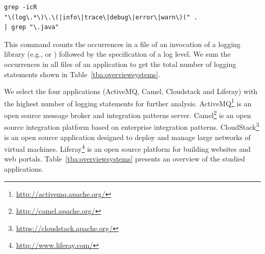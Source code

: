 \vspace{-5mm}
\begin{Code}
\begin{lstlisting}[caption={Counting logging statements}, label={lst:grep}]
grep -icR 
"\(log\.*\)\.\(|info\|trace\|debug\|error\|warn\)(" . 
| grep "\.java"
\end{lstlisting}
\end{Code}
\vspace{-5mm}

This command counts the occurrences in a file of an invocation of a logging library (e.g.,  or ) followed by the specification of a log level. We sum the occurrences in all files of an application to get the total number of logging statements shown in Table~\ref{tba:overviewsystems}.
 
We select the four applications (ActiveMQ, Camel, Cloudstack and Liferay) with the highest number of logging statements for further analysis. ActiveMQ\footnote{\url{http://activemq.apache.org/}} is an open source message broker and integration patterns server. Camel\footnote{\url{http://camel.apache.org/}} is an open source integration platform based on enterprise integration patterns. CloudStack\footnote{\url{https://cloudstack.apache.org/}} is an open source application designed to deploy and manage large networks of virtual machines. Liferay\footnote{\url{http://www.liferay.com/}} is an open source platform for building websites and web portals. Table~\ref{tba:overviewsystems} presents an overview of the studied applications. %


